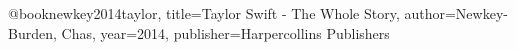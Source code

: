 
@book{newkey2014taylor,
  title={Taylor Swift - The Whole Story},
  author={Newkey-Burden, Chas},
  year={2014},
  publisher={Harpercollins Publishers}
}